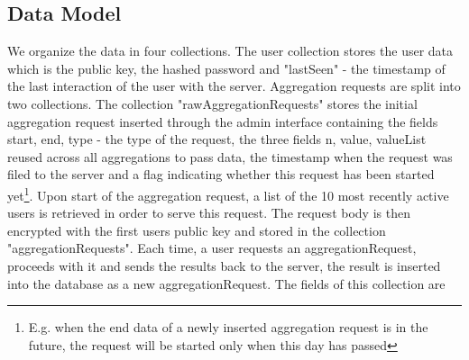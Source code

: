 \subsection{Data Model}\label{server-data-model}
We organize the data in four collections. The user collection stores the user data which is the public key, the hashed password and "lastSeen" - the timestamp of the last interaction of the user with the server. Aggregation requests are split into two collections. The collection "rawAggregationRequests" stores the initial aggregation request inserted through the admin interface containing the fields start, end, type - the type of the request, the three fields n, value, valueList reused across all aggregations to pass data, the timestamp when the request was filed to the server and a flag indicating whether this request has been started yet\footnote{E.g. when the end data of a newly inserted aggregation request is in the future, the request will be started only when this day has passed}. Upon start of the aggregation request, a list of the 10 most recently active users is retrieved in order to serve this request. The request body is then encrypted with the first users public key and stored in the collection "aggregationRequests". Each time, a user requests an aggregationRequest, proceeds with it and sends the results back to the server, the result is inserted into the database as a new aggregationRequest. The fields of this collection are 
